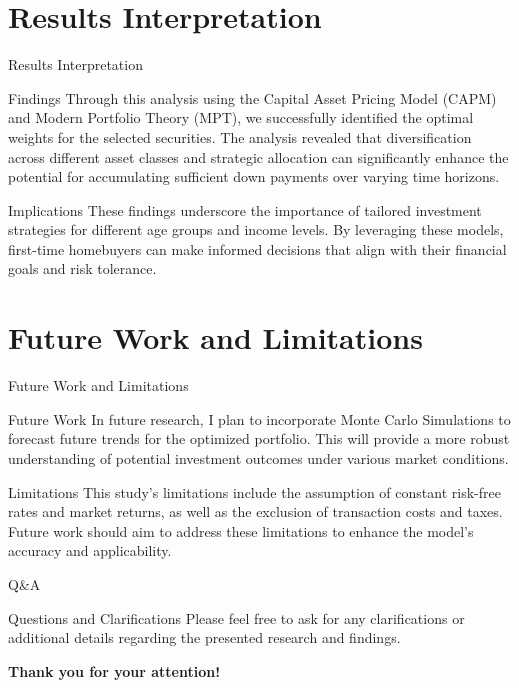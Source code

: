 \documentclass{beamer}
\begin{document}
\section{Results Interpretation}
\begin{frame}{Results Interpretation}
    \begin{block}{Findings}
        Through this analysis using the Capital Asset Pricing Model (CAPM) and Modern Portfolio Theory (MPT), we successfully identified the optimal weights for the selected securities. The analysis revealed that diversification across different asset classes and strategic allocation can significantly enhance the potential for accumulating sufficient down payments over varying time horizons.
    \end{block}
    \begin{block}{Implications}
        These findings underscore the importance of tailored investment strategies for different age groups and income levels. By leveraging these models, first-time homebuyers can make informed decisions that align with their financial goals and risk tolerance.
    \end{block}
\end{frame}

\section{Future Work and Limitations}
\begin{frame}{Future Work and Limitations}
    \begin{block}{Future Work}
        In future research, I plan to incorporate Monte Carlo Simulations to forecast future trends for the optimized portfolio. This will provide a more robust understanding of potential investment outcomes under various market conditions.
    \end{block}
    \begin{block}{Limitations}
        This study's limitations include the assumption of constant risk-free rates and market returns, as well as the exclusion of transaction costs and taxes. Future work should aim to address these limitations to enhance the model's accuracy and applicability.
    \end{block}
\end{frame}

\begin{frame}{Q\&A}
    \begin{block}{Questions and Clarifications}
        Please feel free to ask for any clarifications or additional details regarding the presented research and findings.
    \end{block}
    \vspace{1cm}
    \begin{center}
        \Large \textbf{Thank you for your attention!}
    \end{center}
\end{frame}
\end{document}
